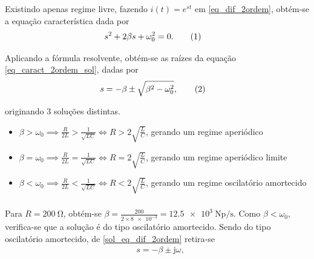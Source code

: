 \documentclass[a4paper, titlepage, portuguese]{article}
\newcommand{\eq}{\Leftrightarrow} %
\newcommand\numberthis{\addtocounter{equation}{1}\tag{\theequation}}
\newcommand\jj{\mathrm{j} }
\begin{document}
	\subsubsection{}
	
		\par
		Existindo apenas regime livre, fazendo $i(t) = e^{st}$ em \ref{eq_dif_2ordem}, obtém-se a equação característica dada por
		\begin{align*}
			&s^{2} + 2\beta s + \omega_{0}^{2} = 0 .\numberthis \label{eq_caract_2ordem_sol}
		\end{align*}
		
		Aplicando a fórmula resolvente, obtém-se as raízes da equação \ref{eq_caract_2ordem_sol}, dadas por
		\begin{align*}
			&s =   -\beta \pm \sqrt{ \beta^{2} - \omega_{0}^{2}}, \numberthis \label{sol_eq_caract_2ordem}
		\end{align*}
		
		originando 3 soluções distintas.
		
		\begin{itemize}
			\item $\beta > \omega_{0} \implies \frac{R}{2L} > \frac{1}{\sqrt{LC}} \eq R > 2 
			\sqrt{\frac{L}{C}}$, gerando um regime aperiódico 
			
			\item $\beta = \omega_{0} \implies \frac{R}{2L} = \frac{1}{\sqrt{LC}} \eq R = 2 
			\sqrt{\frac{L}{C}}$, gerando um regime aperiódico limite
			
			\item $\beta < \omega_{0} \implies \frac{R}{2L} < \frac{1}{\sqrt{LC}} \eq R < 2 
			\sqrt{\frac{L}{C}}$, gerando um regime oscilatório amortecido
		\end{itemize}
		
	\subsubsection{}
	
		\par
		Para $R = \SI{200}{\ohm} $, obtém-se $\beta = \frac{200}{2 \times \num{8e-3}} = \SI{12.5e3}{\neper\per\second}$. Como $\beta < \omega_{0}$, verifica-se que a solução é do tipo oscilatório amortecido. Sendo do tipo oscilatório amortecido, de \ref{sol_eq_dif_2ordem} retira-se 
		\begin{align*}
			&s =   -\beta \pm \jj \omega, 
		\end{align*}
		
\end{document}
